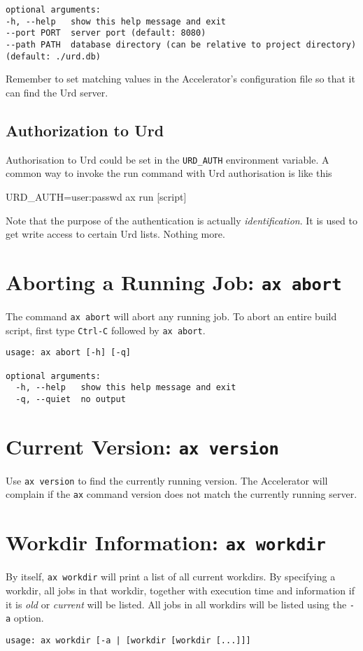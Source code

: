 \begin{shell}
\begin{snugshade}
\begin{verbatim}
optional arguments:
-h, --help   show this help message and exit
--port PORT  server port (default: 8080)
--path PATH  database directory (can be relative to project directory)
(default: ./urd.db)
\end{verbatim}
\end{snugshade}
Remember to set matching values in the Accelerator's configuration
file so that it can find the Urd server.


\subsection{Authorization to Urd}
Authorisation to Urd could be set in the \texttt{URD\_AUTH}
environment variable.  A common way to invoke the run command with Urd
authorisation is like this
\begin{shell}
URD_AUTH=user:passwd ax run [script]
\end{shell}
Note that the purpose of the authentication is
actually \textsl{identification}.  It is used to get write access to
certain Urd lists.  Nothing more.


\section{Aborting a Running Job: \texttt{ax abort}}
The command \texttt{ax abort} will abort any running job.  To abort an
entire build script, first type \texttt{Ctrl-C} followed by \texttt{ax
  abort}.
\begin{snugshade}
\begin{verbatim}
usage: ax abort [-h] [-q]

optional arguments:
  -h, --help   show this help message and exit
  -q, --quiet  no output
\end{verbatim}
\end{snugshade}


\section{Current Version: \texttt{ax version}}
Use \texttt{ax version} to find the currently running version.  The
Accelerator will complain if the \texttt{ax} command version does not
match the currently running server.


\section{Workdir Information: \texttt{ax workdir}}
By itself, \texttt{ax workdir} will print a list of all current
workdirs.  By specifying a workdir, all jobs in that workdir, together
with execution time and information if it is \textsl{old} or
\textsl{current} will be listed.  All jobs in all workdirs will be
listed using the \texttt{-a} option.
\begin{snugshade}
\begin{verbatim}
usage: ax workdir [-a | [workdir [workdir [...]]]


\end{verbatim}
\end{snugshade}
\end{shell}
